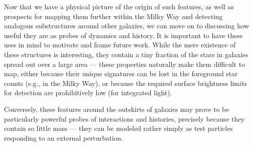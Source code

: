 \documentclass[galaxies,article,submit,moreauthors,pdftex,10pt,a4paper]{mdpi}
\begin{document}
Now that we have a physical picture of the origin of such features, as well as prospects for mapping them further within the Milky Way and detecting analogous substructures around other galaxies, we can move on to discussing how useful they are as probes of dynamics and history.
It is important to have these uses in mind to motivate and frame  future work.
While the mere existence of these structures is interesting, they contain a tiny fraction of the stars in galaxies spread out over a large area --- these properties naturally make them difficult to map, either because their unique signatures can be lost in the foreground star counts (e.g., in the Milky Way), or  because the required surface brightness limits for detection are prohibitively low (for integrated light).

Conversely, these features around the outskirts of galaxies may prove to be particularly powerful probes of interactions and histories, precisely because they contain so little mass --- they can be modeled rather simply as test particles responding to an external perturbation.
\end{document}
